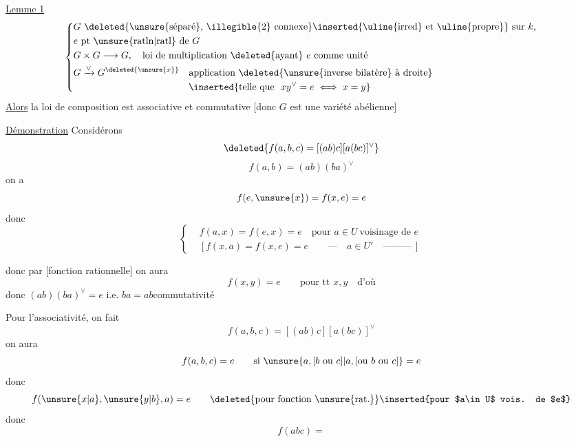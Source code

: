 \uline{Lemme 1}
\[
\left\{\begin{aligned}
&G\ \text{\deleted{\unsure{séparé}, \illegible{2} connexe}\inserted{\uline{irred} et \uline{propre}} sur $k$,}\\
&e\ \text{pt \unsure{ratln|ratl} de $G$}\\
&G\times G\longrightarrow G,\quad\text{loi de multiplication \deleted{ayant} $e$ comme unité}\\
&G\xrightarrow{\vee}G^{\deleted{\unsure{x}}}\quad\text{application \deleted{\unsure{inverse bilatère} à droite}}\\
&\hspace{12em}\inserted{\text{telle que }\ xy^{\vee}=e\iff x=y}
\end{aligned}\right.
\]
\uline{Alors}  la loi de composition est associative et commutative [donc $G$ est une variété abélienne]

\uline{Démonstration} Considérons
\[
\deleted{f(a,b,c)=[(ab)c][a(bc)]^{\vee}}
\]
\[
f(a,b)=(ab)(ba)^{\vee}
\]
on a
\[
f(e,\unsure{x})=f(x,e)=e
\]
donc
\[
\left\{\begin{aligned}
&f(a,x)=f(e,x)=e\quad\text{pour }a\in U\ \text{voisinage de }e\\
&[f(x,a)=f(x,e)=e\qquad\text{---}\quad a\in U'\quad\text{---------}\,]
\end{aligned}\right.
\]

donc par \uline{} [fonction rationnelle] on aura
\[
f(x,y)=e\qquad\text{pour tt }x,y\quad\text{d'où}
\]
donc $(ab)(ba)^{\vee}=e$ i.e. $ba=ab$\hfill commutativité

Pour l'associativité, on fait
\[
f(a,b,c)=[(ab)c][a(bc)]^{\vee}
\]
on aura
\[
f(a,b,c)=e\qquad\text{si }\unsure{a,[b\ \text{ou}\ c]|a,[\text{ou } b\ \text{ou }c]}=e
\]
donc
\[
f(\unsure{x|a},\unsure{y|b},a)=e\qquad
\text{\deleted{pour fonction \unsure{rat.}}\inserted{pour $a\in U$ vois. de $e$}}
\]
donc
\[
f(abc)=
\]
